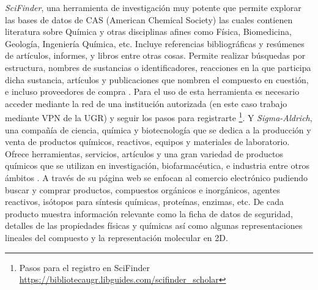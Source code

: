 \emph{SciFinder}, una herramienta de investigación muy potente que permite explorar las bases de datos de CAS (American Chemical Society) las cuales contienen literatura sobre Química y otras disciplinas afines como Física, Biomedicina, Geología, Ingeniería Química, etc. Incluye referencias bibliográficas y resúmenes de artículos, informes, y libros entre otras cosas. Permite realizar búsquedas por estructura, nombres de sustancias o identificadores, reacciones en la que participa dicha sustancia, artículos y publicaciones que nombren el compuesto en cuestión, e incluso proveedores de compra \cite{scifinder_website}. Para el uso de esta herramienta es necesario acceder mediante la red de una institución autorizada (en este caso trabajo mediante VPN de la UGR) y seguir los pasos para registrarte \footnote{Pasos para el registro en SciFinder \url{https://bibliotecaugr.libguides.com/scifinder_scholar}}. Y \emph{Sigma-Aldrich}, una compañía de ciencia, química y biotecnología que se dedica a la producción y venta de productos químicos, reactivos, equipos y materiales de laboratorio. Ofrece herramientas, servicios, artículos y una gran variedad de productos químicos que se utilizan en investigación, biofarmacéutica, e industria entre otros ámbitos \cite{sigma_aldrich_web}. A través de su página web se enfocan al comercio electrónico pudiendo buscar y comprar productos, compuestos orgánicos e inorgánicos, agentes reactivos, isótopos para síntesis químicas, proteínas, enzimas, etc. De cada producto muestra información relevante como la ficha de datos de seguridad, detalles de las propiedades físicas y químicas así como algunas representaciones lineales del compuesto y la representación molecular en 2D.





